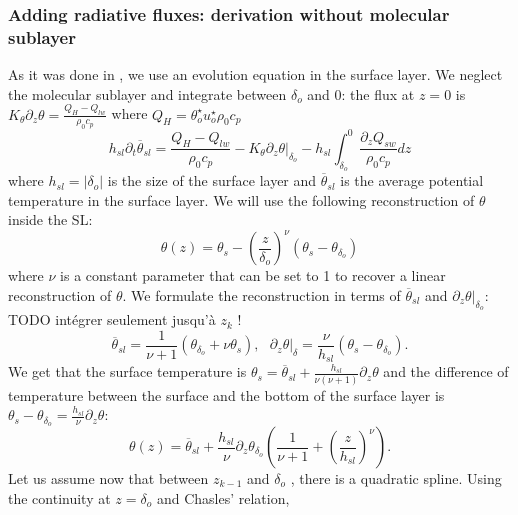\subsubsection{Adding radiative fluxes: derivation without
molecular sublayer}
As it was done in 
\citep{zeng_prognostic_2005}, we use an evolution equation
in the surface layer. We neglect the molecular sublayer and
integrate between $\delta_o$ and 0:
the flux at $z=0$ is
$K_\theta \partial_z \theta = \frac{Q_H - Q_{lw}}{\rho_0 c_p}$
where $Q_H = \theta_o^\star u_o^\star \rho_0 c_p$
\begin{equation}
\label{eq:evolEqOSL}
h_{sl}\partial_t \overline{\theta}_{sl} =
\frac{Q_H - Q_{lw}}{\rho_0 c_p}
- \left. K_\theta \partial_z \theta 
\right|_{\delta_{o}}
- h_{sl}\int_{\delta_o}^0
\frac{\partial_z Q_{sw}}{\rho_0 c_p} dz
\end{equation}
where $h_{sl} = |\delta_o|$
is the size of the surface layer and
$\overline{\theta}_{sl}$ is the average potential
temperature in the surface layer.
We will use the following reconstruction of $\theta$
inside the SL:
\begin{equation}
    \theta(z) = \theta_s -
    \left(\frac{z}{\delta_{o}}\right)^\nu \left( \theta_s - 
    \theta_{\delta_o}\right)
\end{equation}
where $\nu$ is a constant parameter that can be set to 1 to
recover a linear reconstruction of $\theta$.
We formulate the reconstruction in terms of $\overline{\theta}_{sl}$
and $\left.\partial_z \theta\right|_{\delta_o}$:
{\color{red} TODO intégrer seulement jusqu'à $z_k$ !}
\begin{equation}
    \overline{\theta}_{sl} = \frac{1}{\nu+1}
    (\theta_{\delta_o} + \nu \theta_s)
, ~~~ \left.\partial_z \theta \right|_\delta
= \frac{\nu}{h_{sl}} (\theta_s - \theta_{\delta_o}).
\end{equation}
We get that the surface temperature
is $\theta_s = \overline{\theta}_{sl}
+ \frac{h_{sl}}{\nu(\nu+1)} \partial_z \theta$ and
the difference of temperature between
the surface and the bottom of the surface layer is
$\theta_s - \theta_{\delta_o} = 
\frac{h_{sl}}{\nu}\partial_z \theta$:
\begin{equation}
    \theta(z) = \overline{\theta}_{sl} +
    \frac{h_{sl}}{\nu} \partial_z \theta_{\delta_o} \left(
    \frac{1}{\nu+1} + \left(\frac{z}{h_{sl}}\right)^\nu
\right).
\end{equation}
Let us assume now that between
$z_{k-1}$ and $\delta_o$ , there is a quadratic spline.
Using the continuity at $z=\delta_o$ and Chasles' relation,

